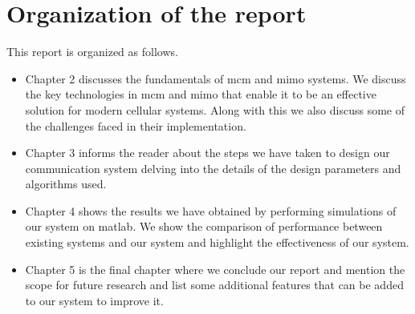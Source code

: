 \section{Organization of the report}

This report is organized as follows. 
\begin{itemize}
\item Chapter 2 discusses the fundamentals of \acrshort{mcm} and \acrshort{mimo} systems. We discuss the key technologies in \acrshort{mcm} and \acrshort{mimo} that enable it to be an effective solution for modern cellular systems. Along with this we also discuss some of the challenges faced in their implementation.
\item Chapter 3 informs the reader about the steps we have taken to design our communication system delving into the details of the design parameters and algorithms used. 
\item Chapter 4 shows the results we have obtained by performing simulations of our system on \gls{matlab}. We show the comparison of performance  between existing systems and our system and highlight the effectiveness of our system.
\item Chapter 5 is the final chapter where we conclude our report and mention the scope for future research and list some additional features that can be added to our system to improve it. 
\end{itemize}

